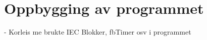 \section{Oppbygging av programmet}
\thispagestyle{fancy}

- Korleis me brukte IEC Blokker, fbTimer osv i programmet